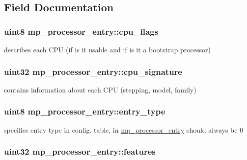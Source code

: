 \subsection{Field Documentation}
\hypertarget{structmp__processor__entry_a3c0959d25eccf5ae21e3129d7a30d6b0}{
\subsubsection[{cpu\_\-flags}]{\setlength{\rightskip}{0pt plus 5cm}uint8 {\bf mp\_\-processor\_\-entry::cpu\_\-flags}}}
\label{structmp__processor__entry_a3c0959d25eccf5ae21e3129d7a30d6b0}
describes each CPU (if is it usable and if is it a bootstrap processor) \hypertarget{structmp__processor__entry_adcc102b4f90141aa248c8f3a8db6b858}{
\subsubsection[{cpu\_\-signature}]{\setlength{\rightskip}{0pt plus 5cm}uint32 {\bf mp\_\-processor\_\-entry::cpu\_\-signature}}}
\label{structmp__processor__entry_adcc102b4f90141aa248c8f3a8db6b858}
contains information about each CPU (stepping, model, family) \hypertarget{structmp__processor__entry_a9bfed0bbe2ddc426309892a4ad178e62}{
\subsubsection[{entry\_\-type}]{\setlength{\rightskip}{0pt plus 5cm}uint8 {\bf mp\_\-processor\_\-entry::entry\_\-type}}}
\label{structmp__processor__entry_a9bfed0bbe2ddc426309892a4ad178e62}
specifies entry type in config. table, in \hyperlink{structmp__processor__entry}{mp\_\-processor\_\-entry} should always be 0 \hypertarget{structmp__processor__entry_a0fee8cc04e85fd4f0622cbbbc8a6832f}{
\subsubsection[{features}]{\setlength{\rightskip}{0pt plus 5cm}uint32 {\bf mp\_\-processor\_\-entry::features}}}
